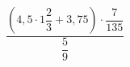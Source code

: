 \begin{ex}[type=calculate]
	\begin{condition}
		\( \dfrac{\left( 4,5\cdot1\dfrac{2}{3}+3,75 \right)\cdot\dfrac{7}{135}}{\dfrac{5}{9}} \) 
	\end{condition}
\end{ex}